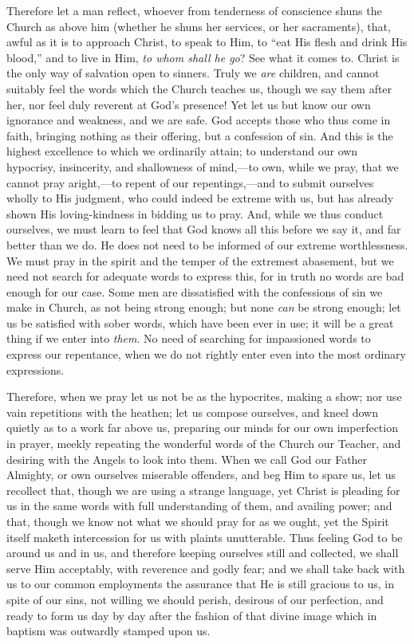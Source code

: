 Therefore let a man reflect, whoever from tenderness
of conscience shuns the Church as above him (whether he
shuns her services, or her sacraments), that, awful as it
is to approach Christ, to speak to Him, to ``eat His
flesh and drink His blood,'' and to live in Him, \emph{to
whom shall he go}? See what it comes to. Christ is the
only way of salvation open to sinners. Truly we \emph{are}
children, and cannot suitably feel the words which the
Church teaches us, though we say them after her, nor feel
duly reverent at God's presence! Yet let us but know our
own ignorance and weakness, and we are safe. God accepts
those who thus come in faith, bringing nothing as their
offering, but a confession of sin. And this is the
highest excellence to which we ordinarily attain; to
understand our own hypocrisy, insincerity, and
shallowness of mind,—to own, while we pray, that we
cannot pray aright,—to repent of our
repentings,—and to submit ourselves wholly to His
judgment, who could indeed be extreme with us, but has
already shown His loving-kindness in bidding us to pray.
And, while we thus conduct ourselves, we must learn to
feel that God knows all this before we say it, and far
better than we do. He does not need to be informed of our
extreme worthlessness. We must pray in the spirit and the
temper of the extremest abasement, but we need not search
for adequate words to express this, for in truth no words
are bad enough for our case. Some men are dissatisfied
with the confessions of sin we make in Church, as not
being strong enough; but none \emph{can} be strong
enough; let us be satisfied with sober words, which have
been ever in use; it will be a great thing if we enter
into \emph{them}. No need of searching for impassioned
words to express our repentance, when we do not rightly
enter even into the most ordinary expressions.

Therefore, when we pray let us not be as the
hypocrites, making a show; nor use vain repetitions with
the heathen; let us compose ourselves, and kneel down
quietly as to a work far above us, preparing our minds
for our own imperfection in prayer, meekly repeating the
wonderful words of the Church our Teacher, and desiring
with the Angels to look into them. When we call God our
Father Almighty, or own ourselves miserable offenders,
and beg Him to spare us, let us recollect that, though we
are using a strange language, yet Christ is pleading for
us in the same words with full understanding of them, and
availing power; and that, though we know not what we
should pray for as we ought, yet the Spirit itself maketh
intercession for us with plaints unutterable. Thus
feeling God to be around us and in us, and therefore
keeping ourselves still and collected, we shall serve Him
acceptably, with reverence and godly fear; and we shall
take back with us to our common employments the assurance
that He is still gracious to us, in spite of our sins,
not willing we should perish, desirous of our perfection,
and ready to form us day by day after the fashion of that
divine image which in baptism was outwardly stamped upon
us.

